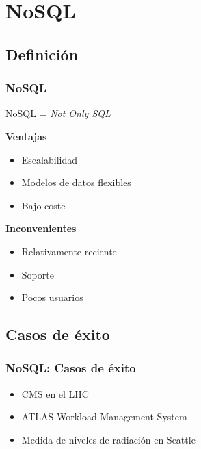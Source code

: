 \documentclass[serif,12pt]{beamer}
\begin{document}
\section{NoSQL}
\subsection{Definición}
\begin{frame}
\frametitle{NoSQL}

NoSQL = \emph{Not Only SQL}

\begin{multicols}{2}

\textbf{Ventajas}
\begin{itemize}
\item Escalabilidad
\item Modelos de datos flexibles
\item Bajo coste
\end{itemize}

\textbf{Inconvenientes}
\begin{itemize}
\item Relativamente reciente
\item Soporte
\item Pocos usuarios
\end{itemize}

\end{multicols}

\end{frame}



\subsection{Casos de éxito}
\begin{frame}
\frametitle{NoSQL: Casos de éxito}

\begin{itemize}
\item CMS en el LHC
\item ATLAS Workload Management System
\item Medida de niveles de radiación en Seattle
\end{itemize}


\end{frame}
\end{document}
